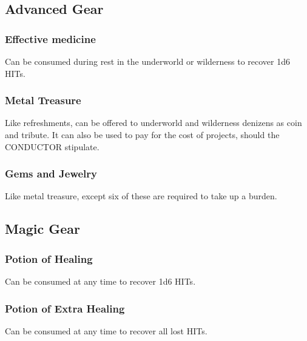 \subsection{Advanced Gear}
\begin{multicols}{2}
\subsubsection*{Effective medicine}
Can be consumed during rest in the underworld or wilderness to recover 1d6 HITs.

\subsubsection*{Metal Treasure}
Like refreshments, can be offered to underworld and wilderness denizens as coin and tribute. It can also be used to pay for the cost of projects, should the CONDUCTOR stipulate.

\subsubsection*{Gems and Jewelry}
Like metal treasure, except six of these are required to take up a burden.

\end{multicols}

\subsection{Magic Gear}
\begin{multicols}{2}
\subsubsection*{Potion of Healing}
Can be consumed at any time to recover 1d6 HITs.

\subsubsection*{Potion of Extra Healing}
Can be consumed at any time to recover all lost HITs.

\end{multicols}